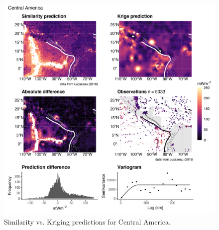 \documentclass[draft,linenumbers]{agujournal2018}
\begin{document}
\begin{figure}[h]

{\centering \includegraphics[width=0.95\linewidth,]{../figs/diff/comp/Central_America} 

}

\caption{Similarity vs. Kriging predictions for Central America.}\label{fig:central.america.comp}
\end{figure}
\end{document}
